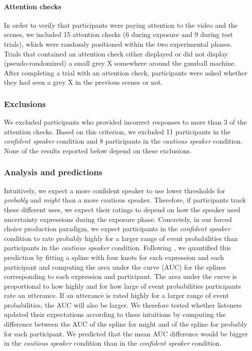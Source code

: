 \documentclass[lucida,biblatex]{sp} %
\begin{document}
\paragraph{Attention checks}  In order to verify that participants were paying attention to the video and the scenes, we included 15 attention checks (6 during exposure and 9 during test trials), which were randomly positioned within the two experimental phases. Trials that contained an attention check either displayed or did not display (pseudo-randomized) a small grey X somewhere around the gumball machine. After completing a trial with an attention check, participants were asked whether they had seen a grey X in the previous scenes or not.

\subsubsection{Exclusions} We excluded participants who provided incorrect responses to more than 3 of the attention checks. Based on this criterion, we excluded 11 participants in the \textit{confident speaker} condition and 8 participants in the \textit{cautious speaker} condition. None of the results reported below depend on these exclusions.


\subsubsection{Analysis and predictions}  

Intuitively, we expect a more confident speaker to use lower thresholds for {\it probably} and {\it might} than a more cautious speaker.
Therefore, if participants track these different uses, we expect their ratings to depend on how the speaker used uncertainty expressions during the exposure phase. 
Concretely,  in our forced choice production paradigm, we expect participants in the \textit{confident speaker} condition to rate {\sc probably} highly for a larger range of event probabilities than participants
in the \textit{cautious speaker} condition. 
Following \cite{Yildirim2016}, we quantified this prediction by fitting a spline with four knots for each expression and each participant and computing the area 
under the curve (AUC) for the splines corresponding to each expression and participant. The area under the curve is proportional to how highly and for how large 
of event probabilities participants rate an utterance. If an utterance is rated highly for a larger range of event probabilities, the AUC will also be larger. 
We therefore tested whether listeners updated their expectations according to these intuitions by computing the difference between the AUC of the spline for 
{\sc might} and of the spline for {\sc probably} for each participant. We predicted that the mean AUC difference would be bigger in the 
\emph{cautious speaker} condition than in the \emph{confident speaker} condition.
\end{document}
